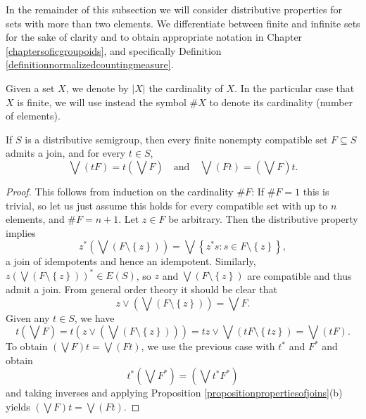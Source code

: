 In the remainder of this subsection we will consider distributive properties for sets with more than two elements. We differentiate between finite and infinite sets for the sake of clarity and to obtain appropriate notation in Chapter \ref{chaptersoficgroupoids}, and specifically Definition \ref{definitionnormalizedcountingmeasure}.

\begin{definition}
Given a set $X$, we denote by $|X|$ the cardinality of $X$. In the particular case that $X$ is finite, we will use instead the symbol $\#X$ to denote its cardinality (number of elements).
\end{definition}

\begin{proposition}\label{propositionfinitarydistributivityofdistributivesemigroups}
If $S$ is a distributive semigroup, then every finite nonempty compatible set $F\subseteq S$ admits a join, and for every $t\in S$,
\[\bigvee(tF)=t\left(\bigvee F\right)\quad\text{and}\quad\bigvee (Ft)=\left(\bigvee F\right)t.\]
\end{proposition}
\begin{proof}
This follows from induction on the cardinality $\#F$: If $\#F=1$ this is trivial, so let us just assume this holds for every compatible set with up to $n$ elements, and $\#F=n+1$. Let $z\in F$ be arbitrary. Then the distributive property implies
\[z^*\left(\bigvee\left(F\setminus\left\{z\right\}\right)\right)=\bigvee\left\{z^*s:s\in F\setminus\left\{z\right\}\right\},\]
a join of idempotents and hence an idempotent. Similarly, $z\left(\bigvee\left(F\setminus\left\{z\right\}\right)\right)^*\in E(S)$, so $z$ and $\bigvee\left(F\setminus\left\{z\right\}\right)$ are compatible and thus admit a join. From general order theory it should be clear that
\[z\lor\left(\bigvee\left(F\setminus\left\{z\right\}\right)\right)=\bigvee F.\]
Given any $t\in S$, we have
\[t\left(\bigvee F\right)=t\left(z\lor\left(\bigvee\left(F\setminus\left\{z\right\}\right)\right)\right)=tz\lor\bigvee\left(tF\setminus\left\{tz\right\}\right)=\bigvee(tF).\]
To obtain $\left(\bigvee F\right)t=\bigvee(Ft)$, we use the previous case with $t^*$ and $F^*$ and obtain
\[t^*\left(\bigvee F^*\right)=\left(\bigvee t^* F^*\right)\]
and taking inverses and applying Proposition \ref{propositionpropertiesofjoins}(b) yields $\left(\bigvee F\right)t=\bigvee(Ft)$.\qedhere
\end{proof}

